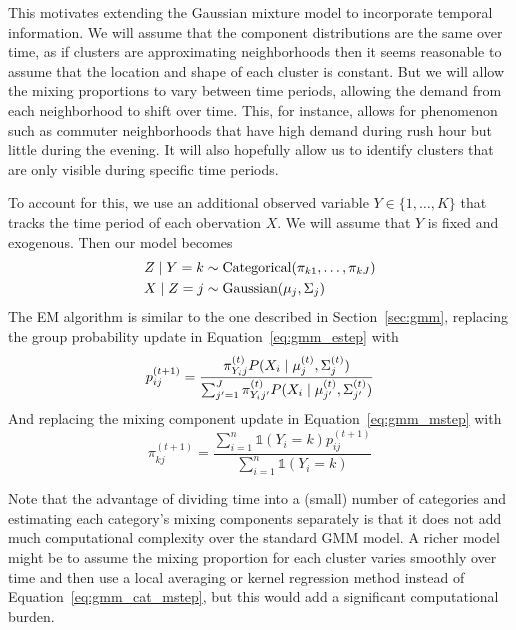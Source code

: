 \documentclass[12pt]{article}
\newcommand*{\I}{\mathds{1}}
\newcommand*{\cond}{\;\ifnum\currentgrouptype=16 \middle\fi|\;}
\newcommand*{\dist}{\sim}
\newcommand*{\mt}[1]{\text{\normalfont #1}}
\theoremstyle{definition}
\theoremstyle{algodesc}
\begin{document}
This motivates extending the Gaussian mixture model to incorporate temporal information. We will assume that the component distributions are the same over time, as if clusters are approximating neighborhoods then it seems reasonable to assume that the location and shape of each cluster is constant. But we will allow the mixing proportions to vary between time periods, allowing the demand from each neighborhood to shift over time. This, for instance, allows for phenomenon such as commuter neighborhoods that have high demand during rush hour but little during the evening. It will also hopefully allow us to identify clusters that are only visible during specific time periods.

To account for this, we use an additional observed variable $Y \in \{1, \dots, K\}$ that tracks the time period of each obervation $X$. We will assume that $Y$ is fixed and exogenous. Then our model becomes
\begin{equation} \label{eq:gmm_cat}
\begin{aligned}
Z \cond Y = k &\dist \mt{Categorical}(\pi_{k1}, \dots, \pi_{kJ}) \\
X \cond Z = j &\dist \mt{Gaussian}(\mu_j, \Sigma_j)
\end{aligned}
\end{equation}
The EM algorithm is similar to the one described in Section~\ref{sec:gmm}, replacing the group probability update in Equation~\ref{eq:gmm_estep} with
\begin{equation} \label{eq:gmm_cat_estep}
p_{ij}^{(t+1)} = \frac{\pi_{Y_i j}^{(t)} P( X_i \cond \mu_j^{(t)}, \Sigma_j^{(t)})}{\sum_{j'=1}^J \pi_{Y_i j'}^{(t)} P( X_i \cond \mu_{j'}^{(t)}, \Sigma_{j'}^{(t)})}
\end{equation}
And replacing the mixing component update in Equation~\ref{eq:gmm_mstep} with
\begin{equation} \label{eq:gmm_cat_mstep}
\pi_{kj}^{(t+1)} = \frac{\sum_{i=1}^n \I(Y_i = k) p_{ij}^{(t+1)} }{\sum_{i=1}^n \I(Y_i = k)}
\end{equation}

Note that the advantage of dividing time into a (small) number of categories and estimating each category's mixing components separately is that it does not add much computational complexity over the standard GMM model. A richer model might be to assume the mixing proportion for each cluster varies smoothly over time and then use a local averaging or kernel regression method instead of Equation~\ref{eq:gmm_cat_mstep}, but this would add a significant computational burden.
\end{document}
